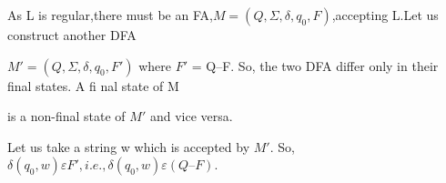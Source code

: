 \documentclass[10pt,a4paper]{book}
\begin{document}
As L is regular,there must be an FA,$M = (Q, \Sigma, \delta, q_{0}, F)$,accepting L.Let us construct another DFA

\begin{flushleft}
  $M\prime = (Q, \Sigma, \delta, q_{0}, F\prime)$ where $F\prime$ = Q–F. So, the two DFA differ only in their final states. A fi nal state of M

is a non-final state of $M\prime$ and vice versa.
\end{flushleft}

Let us take a string w which is accepted by $M\prime$. So,$\delta(q_{0}, w) \varepsilon F\prime, i.e., \delta(q_{0}, w) \varepsilon (Q – F)$.
\end{document}
